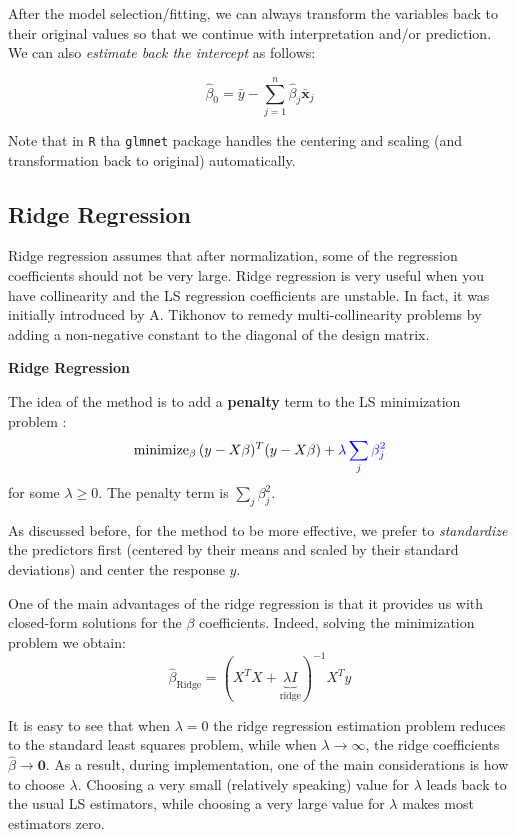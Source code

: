 \documentclass[
]{book}
\begin{document}
After the model selection/fitting, we can always transform the variables back to their original values so that we continue with interpretation and/or prediction. We can also \emph{estimate back the intercept} as follows:

\[\hat{\beta}_0 = \bar{y} - \sum_{j=1}^{n} \hat{\beta}_j \bar{\mathbf{x}}_{j} \]

Note that in \texttt{R} tha \texttt{glmnet} package handles the centering and scaling (and transformation back to original) automatically.

\subsection{Ridge Regression}\label{ridge-regression}

Ridge regression assumes that after normalization, some of the regression coefficients should not be very large. Ridge regression is very useful when you have collinearity and the LS regression coefficients are unstable. In fact, it was initially introduced by A. Tikhonov to remedy multi-collinearity problems by adding a non-negative constant to the diagonal of the design matrix.

\textbf{Ridge Regression}

The idea of the method is to add a \textbf{penalty} term to the LS minimization problem :
\[\text{minimize}_{\beta}\,  (y-X \beta)^T(y-X \beta) + {\color{blue}{\lambda \sum_j \beta_j^2}}\]
for some \(\lambda \ge 0\). The penalty term is \(\sum_j \beta_j^2\).

As discussed before, for the method to be more effective, we prefer to \emph{standardize} the predictors first (centered by their means and scaled by their standard deviations) and center the response \(y\).

One of the main advantages of the ridge regression is that it provides us with closed-form solutions for the \(\beta\) coefficients. Indeed, solving the minimization problem we obtain:
\[\hat{\beta}_{\text{Ridge}}=(X^T X+\underbrace{\lambda I}_{\text{ridge}})^{-1} X^T y\]

It is easy to see that when \(\lambda=0\) the ridge regression estimation problem reduces to the standard least squares problem, while when \(\lambda \rightarrow \infty\), the ridge coefficients \(\hat{\beta} \rightarrow \mathbf{0}\). As a result, during implementation, one of the main considerations is how to choose \(\lambda\). Choosing a very small (relatively speaking) value for \(\lambda\) leads back to the usual LS estimators, while choosing a very large value for \(\lambda\) makes most estimators zero.
\end{document}
